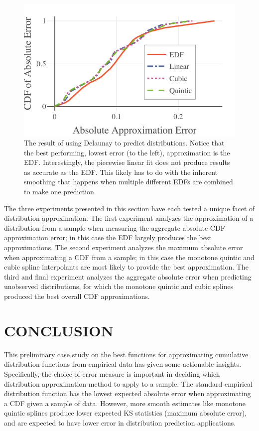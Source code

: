 \documentclass[letterpaper, 10 pt, conference]{ieeeconf}  %
\begin{document}
\begin{figure}
  \vspace{-.3cm}
  \includegraphics[width=.5\textwidth]{delaunay-predictions.pdf}
  \caption{The result of using Delaunay to predict distributions. Notice that the best performing, lowest error (to the left), approximation is the EDF. Interestingly, the piecewise linear fit does not produce results as accurate as the EDF. This likely has to do with the inherent smoothing that happens when multiple different EDFs are combined to make one prediction.
  \vspace{-.5cm}}
  \label{fig:delaunay-errors}
\end{figure}


The three experiments presented in this section have each tested a unique facet of distribution approximation. The first experiment analyzes the approximation of a distribution from a sample when measuring the aggregate absolute CDF approximation error; in this case the EDF largely produces the best approximations. The second experiment analyzes the maximum absolute error when approximating a CDF from a sample; in this case the monotone quintic and cubic spline interpolants are most likely to provide the best approximation. The third and final experiment analyzes the aggregate absolute error when predicting unobserved distributions, for which the monotone quintic and cubic splines produced the best overall CDF approximations.




\section{CONCLUSION}
\label{sec:conclusion}

This preliminary case study on the best functions for approximating cumulative distribution functions from empirical data has given some actionable insights. Specifically, the choice of error measure is important in deciding which distribution approximation method to apply to a sample. The standard empirical distribution function has the lowest expected absolute error when approximating a CDF given a sample of data. However, more smooth estimates like monotone quintic splines produce lower expected KS statistics (maximum absolute error), and are expected to have lower error in distribution prediction applications.
\end{document}
